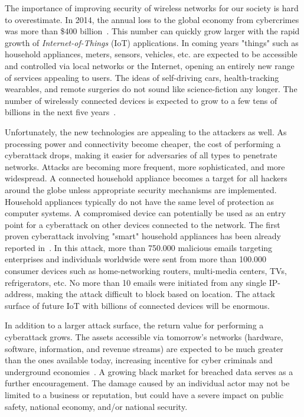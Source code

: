 \documentclass[9pt,conference]{IEEEtran} \usepackage{times}
\begin{document}
The importance of improving security of wireless networks for our society is hard to overestimate. 
In 2014, the annual loss to the global economy from cybercrimes was more than \$400 billion~\cite{Cy14}.
This number can  quickly grow larger with the rapid growth of {\em Internet-of-Things} (IoT) applications. 
In coming years "things" such as household appliances, meters, sensors, vehicles, etc. are expected to be accessible and controlled via local networks or the Internet, opening an entirely new range of services appealing to users.  
The ideas of self-driving cars, health-tracking wearables, and remote surgeries do not sound like science-fiction any longer. The number of wirelessly connected devices is  expected
to grow to a few tens of billions in the next five years~\cite{Er12}.

Unfortunately, the new technologies are appealing to the attackers as well. As processing power and connectivity become
cheaper, the cost of performing a cyberattack drops, making it easier for adversaries of all types to penetrate networks. Attacks are becoming more frequent, more sophisticated, and more widespread.
A connected household appliance becomes a target for all hackers around the globe unless appropriate security mechanisms are implemented. Household  appliances typically do not have the same level of protection as computer systems. A compromised device can potentially be used as an entry point for a cyberattack on other devices connected to the network.  The first proven cyberattack involving "smart" household  appliances has been already reported in~\cite{Pr14}. In this attack, more than 750.000 malicious emails targeting enterprises and individuals worldwide were sent from more than 100.000 consumer devices such as home-networking routers, multi-media centers, TVs, refrigerators, etc. No more than 10 emails were initiated from any single IP-address, making the attack difficult to block based on location. The attack surface of future IoT with billions of connected devices
will be enormous.

In addition to a larger attack surface, the return value for performing a cyberattack grows. 
The assets accessible via tomorrow's networks (hardware, software, information, and revenue streams) are expected to be much greater than the ones available today,  
increasing incentive for cyber criminals and underground economies~\cite{Er5G}. A growing black market for breached data serves as a further encouragement. 
The damage caused by an individual actor may not be limited to a business or reputation, but could have a severe impact on public safety, national economy, and/or national security. 
\end{document}
